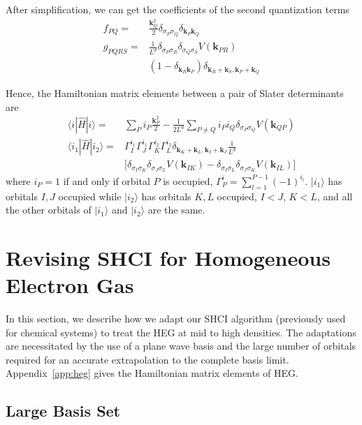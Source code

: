 After simplification, we can get the coefficients of the second quantization terms
\begin{align*}
f_{PQ}= & \frac{\mathbf{k}_Q^2}{2}\delta_{\sigma_P\sigma_Q}\delta_{\mathbf{k}_P\mathbf{k}_Q}\\
g_{PQRS}= & \frac{1}{L^d}\delta_{\sigma_P\sigma_R}\delta_{\sigma_Q\sigma_S}V(\mathbf{k}_{PR})\\
& (1-\delta_{\mathbf{k}_R\mathbf{k}_P})\delta_{\mathbf{k}_R+\mathbf{k}_S,\mathbf{k}_P+\mathbf{k}_Q}
\end{align*}

Hence, the Hamiltonian matrix elements between a pair of Slater determinants are
\begin{align*}
\langle i|\hat{H}|i\rangle  = & \sum_{P}i_P\frac{\mathbf{k}_P^2}{2}-\frac{1}{2L^d}\sum_{P\ne Q}i_Pi_Q\delta_{\sigma_P\sigma_Q}V(\mathbf{k}_{QP})\\
\langle i_1|\hat{H}|i_2\rangle  = &  \Gamma_I^{i_1}\Gamma_J^{i_1}\Gamma_K^{i_2}\Gamma_L^{i_2}\delta_{\mathbf{k}_K+\mathbf{k}_L,\mathbf{k}_I+\mathbf{k}_J}\frac{1}{L^d}\\
&  \lbrack\delta_{\sigma_I\sigma_K}\delta_{\sigma_J\sigma_L}V(\mathbf{k}_{IK})-\delta_{\sigma_I\sigma_L}\delta_{\sigma_J\sigma_K}V(\mathbf{k}_{IL})\rbrack
\end{align*}
where $i_P=1$ if and only if orbital $P$ is occupied, $\Gamma_P^i=\sum_{l=1}^{P-1}(-1)^{i_l}$. $|i_1\rangle$ has orbitals $I,J$ occupied while $|i_2\rangle$ has orbitals $K,L$ occupied, $I<J$, $K<L$, and all the other orbitals of $|i_1\rangle$ and $|i_2\rangle$ are the same.

\section{Revising SHCI for Homogeneous Electron Gas}
\label{HEG}
In this section, we describe how we adapt our SHCI algorithm (previously used for chemical systems) to treat the HEG at mid to high densities.
The adaptations are necessitated by the use of a plane wave basis and the large number of orbitals
required for an accurate extrapolation to the complete basis limit.
Appendix~\ref{app:heg} gives the Hamiltonian matrix elements of HEG.

\subsection{Large Basis Set}

